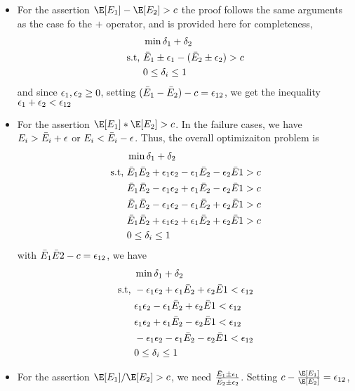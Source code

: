 \begin{itemize}
    \item For the assertion $\E[E_1] - \E[E_2] > c$ the proof follows the same arguments as the case fo the $+$ operator, and is provided here for completeness,
    \begin{align*}
        &\min{\delta_1 + \delta_2}\\
        \text{s.t, }  &\bar{E}_1 \pm \epsilon_1 - (\bar{E}_2 \pm \epsilon_2) > c\\
        & 0 \leq \delta_i \leq 1
    \end{align*}
    and since $\epsilon_1, \epsilon_2 \geq 0$, setting $(\bar{E}_1 - \bar{E}_2) - c = \epsilon_{12}$, we get the inequality $\epsilon_1 + \epsilon_2 < \epsilon_{12}$
    \item For the assertion $\E[E_1] * \E[E_2] > c$. In the failure cases, we have $E_i > \bar{E}_i + \epsilon$ or $E_i < \bar{E}_i - \epsilon$. Thus, the overall optimizaiton problem is
    \begin{align*}
        &\min{\delta_1 + \delta_2} \\
        \text{s.t, } &\bar{E}_1 \bar{E}_2 + \epsilon_1 \epsilon_2 -\epsilon_1\bar{E}_2 - \epsilon_2\bar{E}1 > c\\
        &\bar{E}_1 \bar{E}_2 - \epsilon_1 \epsilon_2 + \epsilon_1\bar{E}_2 - \epsilon_2\bar{E}1 > c \\
        &\bar{E}_1 \bar{E}_2 - \epsilon_1 \epsilon_2 - \epsilon_1\bar{E}_2 + \epsilon_2\bar{E}1 > c\\
        &\bar{E}_1 \bar{E}_2 + \epsilon_1 \epsilon_2 + \epsilon_1\bar{E}_2 + \epsilon_2\bar{E}1 > c\\
        &0 \leq \delta_i \leq 1
    \end{align*}
    with $\bar{E}_1\bar{E}2 - c = \epsilon_{12}$, we have
    \begin{align*}
        &\min{\delta_1 + \delta_2} \\
        \text{s.t, } & - \epsilon_1 \epsilon_2 +\epsilon_1\bar{E}_2 + \epsilon_2\bar{E}1 < \epsilon_{12}\\
        &  \epsilon_1 \epsilon_2 - \epsilon_1\bar{E}_2 + \epsilon_2\bar{E}1 < \epsilon_{12} \\
        &  \epsilon_1 \epsilon_2 + \epsilon_1\bar{E}_2 - \epsilon_2\bar{E}1 < \epsilon_{12}\\
        & -\epsilon_1 \epsilon_2 - \epsilon_1\bar{E}_2 - \epsilon_2\bar{E}1 < \epsilon_{12}\\
        &0 \leq \delta_i \leq 1
    \end{align*}
    \item For the assertion $\E[E_1]/\E[E_2] > c$, we need $\frac{\bar{E}_1 \pm \epsilon_1}{\bar{E}_2 \pm \epsilon_2}$. Setting $c - \frac{\E[E_1]}{\E[E_2]} = \eps_{12}$,
\end{itemize}

